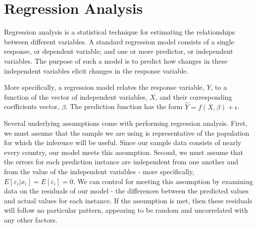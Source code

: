\documentclass[oneside,12pt]{report}
\begin{document}
\section*{Regression Analysis}

Regression analysis is a statistical technique for estimating the relationships between different variables. A standard regression model consists of a single response, or dependent variable; and one or more predictor, or independent variables. The purpose of such a model is to predict how changes in these independent variables elicit changes in the response variable.

More specifically, a regression model relates the response variable, \begin{math}Y\end{math}, to a function of the vector of independent variables, \begin{math}X\end{math}, and their corresponding coefficients vector, \begin{math}\beta\end{math}. The prediction function has the form \begin{math}\hat{Y} = f(X,\beta) + \epsilon\end{math}.

Several underlying assumptions come with performing regression analysis. First, we must assume that the sample we are using is representative of the population for which the inference will be useful. Since our sample data consists of nearly every country, our model meets this assumption. Second, we must assume that the errors for each prediction instance are independent from one another and from the value of the independent variables - more specifically, \begin{math}E[\varepsilon_i|x_i] = E[\varepsilon_i] = 0\end{math}. We can control for meeting this assumption by examining data on the residuals of our model - the differences between the predicted values and actual values for each instance. If the assumption is met, then these residuals will follow no particular pattern, appearing to be random and uncorrelated with any other factors.
\end{document}
